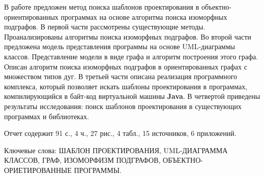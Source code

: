 \Referat

В работе предложен метод поиска шаблонов проектирования в объектно-ориентированных
программах на основе алгоритма поиска изоморфных подграфов.
В первой части рассмотрены существующие методы.
Проанализированы алгоритмы поиска изоморфных подграфов.
Во второй части предложена модель представления программы на основе UML-диаграммы классов.
Представление модели в виде графа и алгоритм построения этого графа.
Описан алгоритм поиска изоморфных подграфов в ориентированных графах с множеством
типов дуг.
В третьей части описана реализация программного комплекса, который позволяет
искать шаблоны проектирования в программах, компилирующийся в байт-код
виртуальной машины \textbf{Java}.
В четвертой приведены результаты исследования: поиск шаблонов проектирования
в существующих программах и библиотеках.

Отчет содержит 91 с., 4 ч., 27 рис., 4 табл., 15 источников, 6 приложений.

Ключевые слова: ШАБЛОН ПРОЕКТИРОВАНИЯ, UML-ДИАГРАММА КЛАССОВ, ГРАФ,
ИЗОМОРФИЗМ ПОДГРАФОВ, ОБЪЕКТНО-ОРИЕТИРОВАННЫЕ ПРОГРАММЫ.
